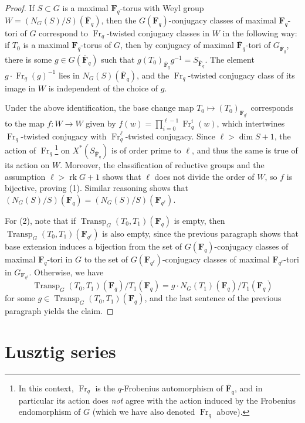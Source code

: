 \documentclass[11pt,reqno]{amsart}
\theoremstyle{definition}
\newcommand{\F}{{\mathbf F}}
\DeclareMathOperator{\Fr}{Fr}
\DeclareMathOperator{\rk}{rk}
\DeclareMathOperator{\Transp}{Transp}
\newcommand{\ol}[1]{\overline{#1}}
\begin{document}
\begin{proof}
    If $S \subset G$ is a maximal $\F_q$-torus with Weyl group $W = (N_G(S)/S)(\ol\F_q)$, then the $G(\F_q)$-conjugacy classes of maximal $\F_q$-tori of $G$ correspond to $\Fr_q$-twisted conjugacy classes in $W$ in the following way: if $T_0$ is a maximal $\F_q$-torus of $G$, then by conjugacy of maximal $\ol\F_q$-tori of $G_{\ol\F_q}$, there is some $g \in G(\ol\F_q)$ such that $g(T_0)_{\ol\F_q}g^{-1} = S_{\ol\F_q}$. The element $g \cdot \Fr_q(g)^{-1}$ lies in $N_G(S)(\ol\F_q)$, and the $\Fr_q$-twisted conjugacy class of its image in $W$ is independent of the choice of $g$.
    
    Under the above identification, the base change map $T_0 \mapsto (T_0)_{\F_{q^\ell}}$ corresponds to the map $f\colon W \to W$ given by $f(w) = \prod_{i=0}^{\ell-1} \Fr_q^i(w)$, which intertwines $\Fr_q$-twisted conjugacy with $\Fr_q^\ell$-twisted conjugacy. Since $\ell > \dim S + 1$, the action of $\Fr_q$\footnote{In this context, $\Fr_q$ is the $q$-Frobenius automorphism of $\ol\F_q$, and in particular its action does \emph{not} agree with the action induced by the Frobenius endomorphism of $G$ (which we have also denoted $\Fr_q$ above).} on $X^*(S_{\ol\F_q})$ is of order prime to $\ell$, and thus the same is true of its action on $W$. Moreover, the classification of reductive groups and the assumption $\ell > \rk G + 1$ shows that $\ell$ does not divide the order of $W$, so $f$ is bijective, proving (1). Similar reasoning shows that $(N_G(S)/S)(\F_q) = (N_G(S)/S)(\F_{q^\ell})$.

    For (2), note that if $\Transp_G(T_0, T_1)(\F_q)$ is empty, then $\Transp_G(T_0, T_1)(\F_{q^\ell})$ is also empty, since the previous paragraph shows that base extension induces a bijection from the set of $G(\F_q)$-conjugacy classes of maximal $\F_q$-tori in $G$ to the set of $G(\F_{q^\ell})$-conjugacy classes of maximal $\F_{q^\ell}$-tori in $G_{\F_{q^\ell}}$. Otherwise, we have
    \[
    \Transp_G(T_0, T_1)(\F_q)/T_1(\F_q) = g \cdot N_G(T_1)(\F_q)/T_1(\F_q)
    \]
    for some $g \in \Transp_G(T_0, T_1)(\F_q)$, and the last sentence of the previous paragraph yields the claim.
\end{proof}







\section{Lusztig series}
\end{document}
